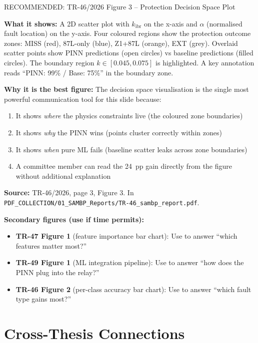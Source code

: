 \documentclass[12pt,a4paper]{article}
\newcommand{\kibr}{k_\mathrm{ibr}}
\begin{document}
\begin{resultbox}{RECOMMENDED: TR-46/2026 Figure 3 -- Protection Decision Space Plot}

\textbf{What it shows:} A 2D scatter plot with $\kibr$ on the x-axis and $\alpha$ (normalised fault location) on the y-axis. Four coloured regions show the protection outcome zones: MISS (red), 87L-only (blue), Z1+87L (orange), EXT (grey). Overlaid scatter points show PINN predictions (open circles) vs baseline predictions (filled circles). The boundary region $k \in [0.045, 0.075]$ is highlighted. A key annotation reads ``PINN: 99\% / Base: 75\%'' in the boundary zone.

\textbf{Why it is the best figure:} The decision space visualisation is the single most powerful communication tool for this slide because:
\begin{enumerate}[nosep]
  \item It shows \textit{where} the physics constraints live (the coloured zone boundaries)
  \item It shows \textit{why} the PINN wins (points cluster correctly within zones)
  \item It shows \textit{when} pure ML fails (baseline scatter leaks across zone boundaries)
  \item A committee member can read the 24~pp gain directly from the figure without additional explanation
\end{enumerate}

\textbf{Source:} TR-46/2026, page 3, Figure 3. In \texttt{PDF\_COLLECTION/01\_SAMBP\_Reports/TR-46\_sambp\_report.pdf}.
\end{resultbox}

\textbf{Secondary figures (use if time permits):}
\begin{itemize}[nosep]
  \item \textbf{TR-47 Figure 1} (feature importance bar chart): Use to answer ``which features matter most?''
  \item \textbf{TR-49 Figure 1} (ML integration pipeline): Use to answer ``how does the PINN plug into the relay?''
  \item \textbf{TR-46 Figure 2} (per-class accuracy bar chart): Use to answer ``which fault type gains most?''
\end{itemize}

\section{Cross-Thesis Connections}
\end{document}

